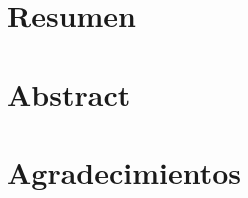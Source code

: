 \documentclass[11pt,twoside,draft]{report}
\begin{document}
    \makecoverletter
    \makeficha

    \chapter*{Resumen} 

    \chapter*{Abstract} 

    \maketitlepuj

    \chapter*{Agradecimientos} 

    
    \printnomenclature[3cm]



    \tableofcontents %

    \listoffigures

    \listoftables

\end{document}
